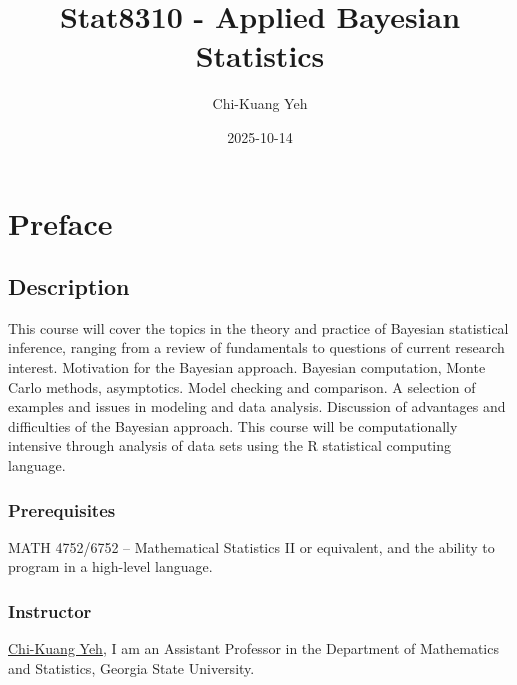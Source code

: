 \documentclass[
  letterpaper,
  DIV=11,
  numbers=noendperiod]{scrreprt}
\title{Stat8310 - Applied Bayesian Statistics}
\author{Chi-Kuang Yeh}
\date{2025-10-14}
\renewcommand*\contentsname{Table of contents}
\newcommand\contentsname{Table of contents}
\begin{document}
\maketitle

\renewcommand*\contentsname{Table of contents}
{
\hypersetup{linkcolor=}
\setcounter{tocdepth}{2}
\tableofcontents
}


\chapter*{Preface}\label{preface}


\section*{Description}\label{description}


This course will cover the topics in the theory and practice of Bayesian
statistical inference, ranging from a review of fundamentals to
questions of current research interest. Motivation for the Bayesian
approach. Bayesian computation, Monte Carlo methods, asymptotics. Model
checking and comparison. A selection of examples and issues in modeling
and data analysis. Discussion of advantages and difficulties of the
Bayesian approach. This course will be computationally intensive through
analysis of data sets using the R statistical computing language.

\subsection*{Prerequisites}\label{prerequisites}

MATH 4752/6752 -- Mathematical Statistics II or equivalent, and the
ability to program in a high-level language.

\subsection*{Instructor}\label{instructor}

\href{https://chikuang.github.io/}{Chi-Kuang Yeh}, I am an Assistant
Professor in the Department of Mathematics and Statistics, Georgia State
University.
\end{document}
